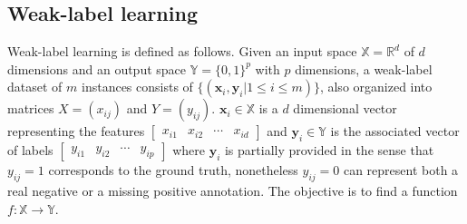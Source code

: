 \documentclass[conference,compsoc]{IEEEtran}
\begin{document}

\subsection{Weak-label learning}


Weak-label learning is defined as follows. Given an input space $\mathbb{X} = \mathbb{R}^d$ of $d$ dimensions and an output space $\mathbb{Y} = \{0, 1\}^p$ with $p$ dimensions, a weak-label dataset of $m$ instances consists of
$\{(\textbf{x}_i,\textbf{y}_i | 1 \leq i \leq m)\}$, also organized into matrices $X = (x_{ij})$ and $Y=(y_{ij})$.
$\textbf{x}_i \in \mathbb{X}$ is a $d$ dimensional vector representing the features $\begin{bmatrix} x_{i1} & x_{i2} & \cdots & x_{id}\end{bmatrix}$ and $\mathbf{y}_i \in \mathbb{Y}$ is the associated vector of labels $\begin{bmatrix} y_{i1} & y_{i2} & \cdots & y_{ip} \end{bmatrix}$ where $\mathbf{y}_i$ is partially provided in the sense that $y_{ij} = 1 $ corresponds to the ground truth, nonetheless $y_{ij} = 0 $ can represent both a real negative or a missing positive annotation. The objective is to find a function $f: \mathbb{X} \rightarrow \mathbb{Y}$. 
\end{document}

